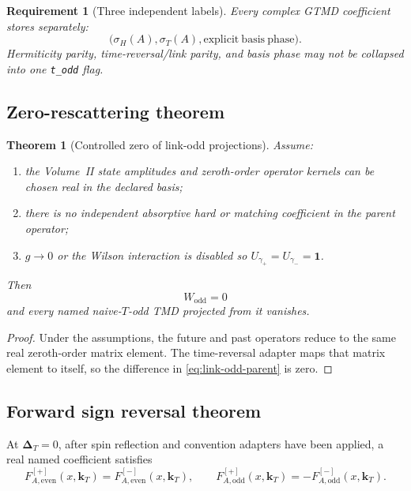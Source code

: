 \documentclass[11pt]{article}
\newtheorem{requirement}[definition]{Requirement}
\newtheorem{theorem}[definition]{Theorem}
\newcommand{\kT}{\bm{k}_{T}}
\newcommand{\DT}{\bm{\Delta}_{T}}
\newcommand{\bbone}{\bm 1}
\newcommand{\odd}{\mathrm{odd}}
\newcommand{\even}{\mathrm{even}}
\begin{document}
\begin{requirement}[Three independent labels]
\label{req:three-phase-labels}
Every complex GTMD coefficient stores separately:
\begin{equation}
 \bigl(
 \sigma_H(A),
 \sigma_T(A),
 \mathrm{explicit\ basis\ phase}
 \bigr).
\label{eq:three-phase-labels}
\end{equation}
Hermiticity parity, time-reversal/link parity, and basis phase may not be
collapsed into one \texttt{t\_odd} flag.
\end{requirement}

\subsection{Zero-rescattering theorem}

\begin{theorem}[Controlled zero of link-odd projections]
\label{thm:zero-rescattering}
Assume:
\begin{enumerate}
\item the Volume~II state amplitudes and zeroth-order operator kernels can be
      chosen real in the declared basis;
\item there is no independent absorptive hard or matching coefficient in the
      parent operator;
\item \(g\to0\) or the Wilson interaction is disabled so
      \(U_{\gamma_+}=U_{\gamma_-}=\bbone\).
\end{enumerate}
Then
\begin{equation}
 W_{\odd}=0
\label{eq:zero-rescattering-odd-zero}
\end{equation}
and every named naive-\(T\)-odd TMD projected from it vanishes.
\end{theorem}

\begin{proof}
Under the assumptions, the future and past operators reduce to the same real
zeroth-order matrix element.  The time-reversal adapter maps that matrix
element to itself, so the difference in \cref{eq:link-odd-parent} is zero.
\end{proof}

\subsection{Forward sign reversal theorem}

At \(\DT=0\), after spin reflection and convention adapters have been
applied, a real named coefficient satisfies
\begin{equation}
 F_{A,\even}^{[+]}(x,\kT)
 =F_{A,\even}^{[-]}(x,\kT),
 \qquad
 F_{A,\odd}^{[+]}(x,\kT)
 =-F_{A,\odd}^{[-]}(x,\kT).
\label{eq:forward-link-reversal}
\end{equation}
\end{document}

